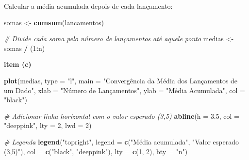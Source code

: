 \documentclass[
]{book}
\newenvironment{Shaded}{\begin{snugshade}}{\end{snugshade}}
\newcommand{\AttributeTok}[1]{\textcolor[rgb]{0.13,0.29,0.53}{#1}}
\newcommand{\CommentTok}[1]{\textcolor[rgb]{0.56,0.35,0.01}{\textit{#1}}}
\newcommand{\DecValTok}[1]{\textcolor[rgb]{0.00,0.00,0.81}{#1}}
\newcommand{\FloatTok}[1]{\textcolor[rgb]{0.00,0.00,0.81}{#1}}
\newcommand{\FunctionTok}[1]{\textcolor[rgb]{0.13,0.29,0.53}{\textbf{#1}}}
\newcommand{\NormalTok}[1]{#1}
\newcommand{\OtherTok}[1]{\textcolor[rgb]{0.56,0.35,0.01}{#1}}
\newcommand{\SpecialCharTok}[1]{\textcolor[rgb]{0.81,0.36,0.00}{\textbf{#1}}}
\newcommand{\StringTok}[1]{\textcolor[rgb]{0.31,0.60,0.02}{#1}}
\begin{document}
Calcular a média acumulada depois de cada lançamento:

\begin{Shaded}
\begin{Highlighting}[]
\NormalTok{somas }\OtherTok{\textless{}{-}} \FunctionTok{cumsum}\NormalTok{(lancamentos)}

\CommentTok{\# Divide cada soma pelo número de lançamentos até aquele ponto}
\NormalTok{medias }\OtherTok{\textless{}{-}}\NormalTok{ somas }\SpecialCharTok{/}\NormalTok{ (}\DecValTok{1}\SpecialCharTok{:}\NormalTok{n)}
\end{Highlighting}
\end{Shaded}

\textbf{item (c)}

\begin{Shaded}
\begin{Highlighting}[]
\FunctionTok{plot}\NormalTok{(medias, }\AttributeTok{type =} \StringTok{"l"}\NormalTok{,}
     \AttributeTok{main =} \StringTok{"Convergência da Média dos Lançamentos de um Dado"}\NormalTok{,}
     \AttributeTok{xlab =} \StringTok{"Número de Lançamentos"}\NormalTok{,}
     \AttributeTok{ylab =} \StringTok{"Média Acumulada"}\NormalTok{,}
     \AttributeTok{col =} \StringTok{"black"}\NormalTok{)}

\CommentTok{\# Adicionar linha horizontal com o valor esperado (3,5)}
\FunctionTok{abline}\NormalTok{(}\AttributeTok{h =} \FloatTok{3.5}\NormalTok{, }\AttributeTok{col =} \StringTok{"deeppink"}\NormalTok{, }\AttributeTok{lty =} \DecValTok{2}\NormalTok{, }\AttributeTok{lwd =} \DecValTok{2}\NormalTok{)}

\CommentTok{\# Legenda}
\FunctionTok{legend}\NormalTok{(}\StringTok{"topright"}\NormalTok{, }\AttributeTok{legend =} \FunctionTok{c}\NormalTok{(}\StringTok{"Média acumulada"}\NormalTok{, }\StringTok{"Valor esperado (3,5)"}\NormalTok{),}
       \AttributeTok{col =} \FunctionTok{c}\NormalTok{(}\StringTok{"black"}\NormalTok{, }\StringTok{"deeppink"}\NormalTok{), }\AttributeTok{lty =} \FunctionTok{c}\NormalTok{(}\DecValTok{1}\NormalTok{, }\DecValTok{2}\NormalTok{), }\AttributeTok{bty =} \StringTok{"n"}\NormalTok{)}
\end{Highlighting}
\end{Shaded}
\end{document}
